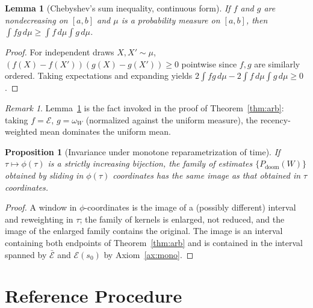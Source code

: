 \documentclass[11pt]{article}
\newtheorem{lemma}{Lemma}[section]
\newtheorem{proposition}{Proposition}[section]
\theoremstyle{remark}
\newtheorem{remark}{Remark}[section]
\newcommand{\PD}{P_{\mathrm{doom}}}
\begin{document}
\begin{lemma}[Chebyshev's sum inequality, continuous form]\label{lem:cheb}
If $f$ and $g$ are nondecreasing on $[a,b]$ and $\mu$ is a probability measure on $[a,b]$, then $\int fg\,d\mu\ge\int f\,d\mu\int g\,d\mu$.
\end{lemma}
\begin{proof}
For independent draws $X,X'\sim\mu$, $(f(X)-f(X'))(g(X)-g(X'))\ge0$ pointwise since $f,g$ are similarly ordered. Taking expectations and expanding yields $2\int fg\,d\mu-2\int f\,d\mu\int g\,d\mu\ge 0$. \qedhere
\end{proof}

\begin{remark}
Lemma~\ref{lem:cheb} is the fact invoked in the proof of Theorem~\ref{thm:arb}: taking $f=\mathcal{E}$, $g=\omega_W$ (normalized against the uniform measure), the recency-weighted mean dominates the uniform mean.
\end{remark}

\begin{proposition}[Invariance under monotone reparametrization of time]\label{prop:inv}
If $\tau\mapsto\phi(\tau)$ is a strictly increasing bijection, the family of estimates $\{\PD(W)\}$ obtained by sliding in $\phi(\tau)$ coordinates has the same image as that obtained in $\tau$ coordinates.
\end{proposition}
\begin{proof}
A window in $\phi$-coordinates is the image of a (possibly different) interval and reweighting in $\tau$; the family of kernels is enlarged, not reduced, and the image of the enlarged family contains the original. The image is an interval containing both endpoints of Theorem~\ref{thm:arb} and is contained in the interval spanned by $\bar{\mathcal{E}}$ and $\mathcal{E}(s_0)$ by Axiom~\ref{ax:mono}. \qedhere
\end{proof}

\section{Reference Procedure}
\end{document}
